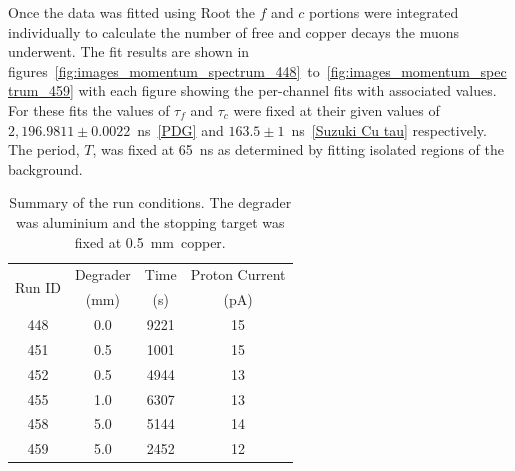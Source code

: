 Once the data was fitted using Root the \(f\) and \(c\) portions were integrated individually to calculate the number of free and copper decays the muons underwent. The fit results are shown in figures~\ref{fig:images_momentum_spectrum_448}~to~\ref{fig:images_momentum_spectrum_459} with each figure showing the per-channel fits with associated values. For these fits the values of \(\tau_{f}\) and \(\tau_{c}\) were fixed at their given values of \( 2,196.9811\pm0.0022 \)~ns~\ref{PDG} and \( 163.5\pm1 \)~ns~\ref{Suzuki Cu tau} respectively. The period, \( T \), was fixed at 65~ns as determined by fitting isolated regions of the background. 

\begin{table}
  \begin{center}
  \begin{tabular}{c|c|c|c}
    \multirow{2}{*}{Run ID}  &  Degrader  &  Time  &  Proton Current  \\
                             &   (mm)     &   (s)  &   (pA)           \\
    \hline
    448  &  0.0   &   9221  &  15  \\
    451  &  0.5   &   1001  &  15  \\
    452  &  0.5   &   4944  &  13  \\
    455  &  1.0   &   6307  &  13  \\
    458  &  5.0   &   5144  &  14  \\
    459  &  5.0   &   2452  &  12  \\
  \end{tabular}
  \end{center}
  \caption{Summary of the run conditions. The degrader was aluminium and the stopping target was fixed at 0.5~mm~copper.}
  \label{tab:music5_run_summary}
\end{table}

